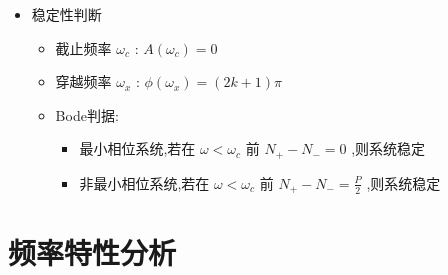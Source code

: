 \documentclass[table]{beamer}
\begin{document}
\begin{frame}
\begin{itemize}
\item 稳定性判断
\label{sec-4-2-1-2}%
\begin{itemize}
\item 截止频率 $\omega_c$ : $A(\omega_c)=0$
\item 穿越频率 $\omega_x$ : $\phi(\omega_x)=(2k+1)\pi$
\item <3->Bode判据:
\begin{itemize}
\item 最小相位系统,若在 $\omega<\omega_c$ 前 $N_+-N_-=0$ ,则系统稳定
\item 非最小相位系统,若在 $\omega<\omega_c$ 前 $N_+-N_-=\frac{P}{2}$ ,则系统稳定
\end{itemize}
\end{itemize}


\end{itemize} %
\end{frame}
\section{频率特性分析}
\label{sec-5}
\end{document}
